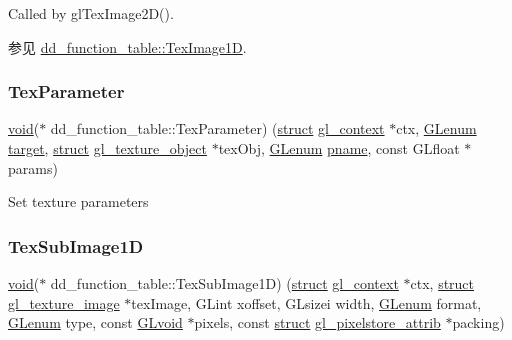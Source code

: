 Called by gl\+Tex\+Image2\+D().

\begin{DoxySeeAlso}{参见}
\hyperlink{structdd__function__table_a0907a18e4f97b0e8f36e50d8f5e7e369}{dd\+\_\+function\+\_\+table\+::\+Tex\+Image1D}. 
\end{DoxySeeAlso}
\mbox{\label{structdd__function__table_a970757885239587824ca27aba98bbe95}} 
\subsubsection{\texorpdfstring{Tex\+Parameter}{TexParameter}}
{\footnotesize\ttfamily \hyperlink{interfacevoid}{void}($\ast$ dd\+\_\+function\+\_\+table\+::\+Tex\+Parameter) (\hyperlink{interfacestruct}{struct} \hyperlink{structgl__context}{gl\+\_\+context} $\ast$ctx, \hyperlink{interfacevoid}{G\+Lenum} \hyperlink{interfacevoid}{target}, \hyperlink{interfacestruct}{struct} \hyperlink{structgl__texture__object}{gl\+\_\+texture\+\_\+object} $\ast$tex\+Obj, \hyperlink{interfacevoid}{G\+Lenum} \hyperlink{interfacevoid}{pname}, const G\+Lfloat $\ast$params)}

Set texture parameters \mbox{\label{structdd__function__table_aa633b8ffb5cbcacb00177fe255481faa}} 
\subsubsection{\texorpdfstring{Tex\+Sub\+Image1D}{TexSubImage1D}}
{\footnotesize\ttfamily \hyperlink{interfacevoid}{void}($\ast$ dd\+\_\+function\+\_\+table\+::\+Tex\+Sub\+Image1D) (\hyperlink{interfacestruct}{struct} \hyperlink{structgl__context}{gl\+\_\+context} $\ast$ctx, \hyperlink{interfacestruct}{struct} \hyperlink{structgl__texture__image}{gl\+\_\+texture\+\_\+image} $\ast$tex\+Image, G\+Lint xoffset, G\+Lsizei width, \hyperlink{interfacevoid}{G\+Lenum} format, \hyperlink{interfacevoid}{G\+Lenum} type, const \hyperlink{interfacevoid}{G\+Lvoid} $\ast$pixels, const \hyperlink{interfacestruct}{struct} \hyperlink{structgl__pixelstore__attrib}{gl\+\_\+pixelstore\+\_\+attrib} $\ast$packing)}

